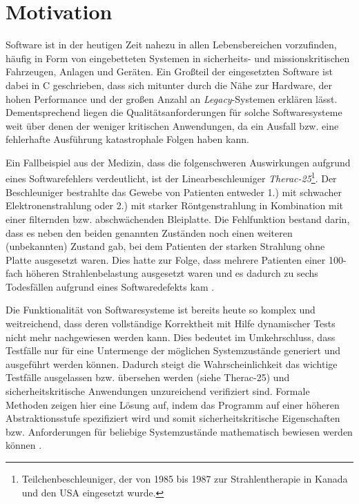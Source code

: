 \section{Motivation}


Software ist in der heutigen Zeit nahezu in allen Lebensbereichen vorzufinden, häufig in Form von eingebetteten Systemen in sicherheits- und missionskritischen Fahrzeugen, Anlagen und Geräten. Ein Großteil der eingesetzten Software ist dabei in C geschrieben, dass sich mitunter durch die Nähe zur Hardware, der hohen Performance und der großen Anzahl an \emph{Legacy}-Systemen erklären lässt. Dementsprechend liegen die Qualitätsanforderungen für solche Softwaresysteme weit über denen der weniger kritischen Anwendungen, da ein Ausfall bzw. eine fehlerhafte Ausführung katastrophale Folgen haben kann.


Ein Fallbeispiel aus der Medizin, dass die folgenschweren Auswirkungen aufgrund eines Softwarefehlers verdeutlicht, ist der Linearbeschleuniger \emph{Therac-25}\footnote{Teilchenbeschleuniger, der von 1985 bis 1987 zur Strahlentherapie in Kanada und den USA eingesetzt wurde.}. Der Beschleuniger bestrahlte das Gewebe von Patienten entweder 1.) mit schwacher Elektronenstrahlung oder 2.) mit starker Röntgenstrahlung in Kombination mit einer filternden bzw. abschwächenden Bleiplatte. Die Fehlfunktion bestand darin, dass es neben den beiden genannten Zuständen noch einen weiteren (unbekannten) Zustand gab, bei dem Patienten der starken Strahlung ohne Platte ausgesetzt waren. Dies hatte zur Folge, dass mehrere Patienten einer 100-fach höheren Strahlenbelastung ausgesetzt waren und es dadurch zu sechs Todesfällen aufgrund eines Softwaredefekts kam \cite{Pfeifer2003}.


Die Funktionalität von Softwaresysteme ist bereits heute so komplex und weitreichend, dass deren vollständige Korrektheit mit Hilfe dynamischer Tests nicht mehr nachgewiesen werden kann. Dies bedeutet im Umkehrschluss, dass Testfälle nur für eine Untermenge der möglichen Systemzustände generiert und ausgeführt werden können. Dadurch steigt die Wahrscheinlichkeit das wichtige Testfälle ausgelassen bzw. übersehen werden (siehe Therac-25) und sicherheitskritische Anwendungen unzureichend verifiziert sind. Formale Methoden zeigen hier eine Lösung auf, indem das Programm auf einer höheren Abstraktionsstufe spezifiziert wird und somit sicherheitskritische Eigenschaften bzw. Anforderungen für beliebige Systemzustände mathematisch bewiesen werden können \cite{Crocker2007}.
